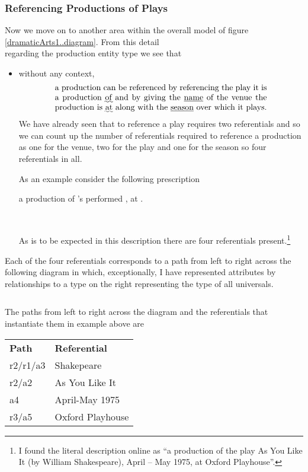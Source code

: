 \subsubsection{Referencing Productions of Plays}
Now we move on to another area within the overall model of figure \ref{dramaticArts1..diagram}. From this detail 
\begin{equation*}

\end{equation*}
regarding the production entity type  we see that
\begin{itemize}
  \item
  without any context, 
  \begin{equation} 
\label{absoluteCharacterReferencing}
\text{\parbox{9cm}{a production can be referenced by referencing the play it is a production \uwave{of} 
  and by giving the \underline{name} of the venue  the production is \uwave{at} along with the \underline{season} 
  over which it plays.}}
\end{equation}
We have already seen that to reference a play requires two referentials and so
we can count up the number of referentials required to reference a production
  as one for the venue, two for the play and one for the season so four referentials in all. 



As an example consider the following prescription
\begin{erquote}
\parbox{9cm}{a production of \mbox{'s} 
 performed \mbox{,} at .}\\
\end{erquote}
As is to be expected in this description there are four referentials present.\footnote{
I found the literal description online as ``a production of the play As You Like It (by William Shakespeare), April – May 1975, at Oxford Playhouse''.  
} 
\end{itemize}
Each of the four referentials corresponds to a path from left to right across the following diagram in which, exceptionally, I have represented attributes by relationships to a type on the right representing the type of all universals.

\begin{equation*}

\end{equation*}

The paths from left to right across the diagram and the referentials that instantiate them in example above are\\
\newline
\begin{tabular}{l l}
\textbf{Path}     & \textbf{Referential} \\
r2/r1/a3 & Shakepeare       \\
r2/a2    & As You Like It   \\
a4       & April-May 1975   \\
r3/a5    & Oxford Playhouse
\end{tabular}


